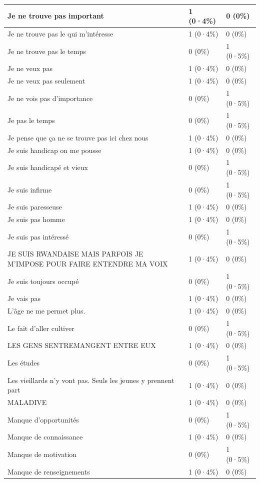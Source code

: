 \documentclass[
]{book}
\begin{document}
\begin{tabular}{l|l|l}
\hline
Je ne trouve pas important & 1 (0·4\%) & 0 (0\%)\\
\hline
Je ne trouve pas le qui m'intéresse & 1 (0·4\%) & 0 (0\%)\\
\hline
Je ne trouve pas le temps & 0 (0\%) & 1 (0·5\%)\\
\hline
Je ne veux pas & 1 (0·4\%) & 0 (0\%)\\
\hline
Je ne veux pas seulement & 1 (0·4\%) & 0 (0\%)\\
\hline
Je ne vois pas d'importance & 0 (0\%) & 1 (0·5\%)\\
\hline
Je pas le temps & 0 (0\%) & 1 (0·5\%)\\
\hline
Je pense que ça ne se trouve pas ici chez nous & 1 (0·4\%) & 0 (0\%)\\
\hline
Je suis handicap on me pousse & 1 (0·4\%) & 0 (0\%)\\
\hline
Je suis handicapé et vieux & 0 (0\%) & 1 (0·5\%)\\
\hline
Je suis infirme & 0 (0\%) & 1 (0·5\%)\\
\hline
Je suis paresseuse & 1 (0·4\%) & 0 (0\%)\\
\hline
Je suis pas homme & 1 (0·4\%) & 0 (0\%)\\
\hline
Je suis pas intéressé & 0 (0\%) & 1 (0·5\%)\\
\hline
JE SUIS RWANDAISE MAIS PARFOIS JE M'IMPOSE POUR FAIRE ENTENDRE MA VOIX & 1 (0·4\%) & 0 (0\%)\\
\hline
Je suis toujours occupé & 0 (0\%) & 1 (0·5\%)\\
\hline
Je vais pas & 1 (0·4\%) & 0 (0\%)\\
\hline
L'âge ne me permet plus. & 1 (0·4\%) & 0 (0\%)\\
\hline
Le fait d'aller cultiver & 0 (0\%) & 1 (0·5\%)\\
\hline
LES  GENS SENTREMANGENT ENTRE EUX & 1 (0·4\%) & 0 (0\%)\\
\hline
Les études & 0 (0\%) & 1 (0·5\%)\\
\hline
Les vieillards n'y vont pas. Seuls les jeunes y prennent part & 1 (0·4\%) & 0 (0\%)\\
\hline
MALADIVE & 1 (0·4\%) & 0 (0\%)\\
\hline
Manque d'opportunités & 0 (0\%) & 1 (0·5\%)\\
\hline
Manque de connaissance & 1 (0·4\%) & 0 (0\%)\\
\hline
Manque de motivation & 0 (0\%) & 1 (0·5\%)\\
\hline
Manque de renseignements & 1 (0·4\%) & 0 (0\%)\\

\end{tabular}
\end{document}
